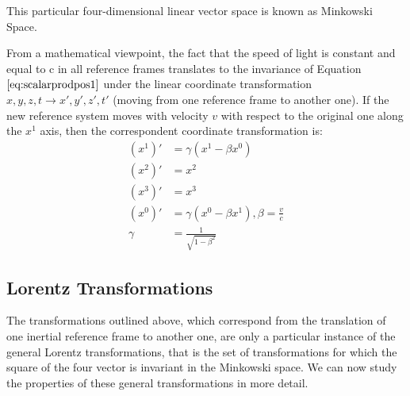 \vspace{2mm}\noindent
This particular four-dimensional linear vector space is known as Minkowski Space. 

 \vspace{2mm}\noindent From a mathematical viewpoint, the fact that the speed of light is constant and equal to c in all reference frames translates to the invariance of Equation $\ref{eq:scalarprodpos1}$ under the linear coordinate transformation $x,y,z,t \to x',y',z',t'$ (moving from one reference frame to another one). If the new reference system moves with velocity $v$ with respect to the original one along the $x^1$ axis, then the correspondent coordinate transformation is:
\begin{align}
    (x^1)' &= \gamma(x^1-\beta x^0)\\
    (x^2)' &= x^2\\
    (x^3)' &= x^3\\
    (x^0)' &= \gamma(x^0-\beta x^1), \beta = \frac{v}{c}\\
    \gamma &= \frac{1}{\sqrt{1-\beta^2}}
\end{align}
\subsection{Lorentz Transformations}
The transformations outlined above, which correspond from the translation of one inertial reference frame to another one, are only a particular instance of the general Lorentz transformations, that is the set of transformations for which the square of the four vector is invariant in the Minkowski space. We can now study the properties of these general transformations in more detail.

